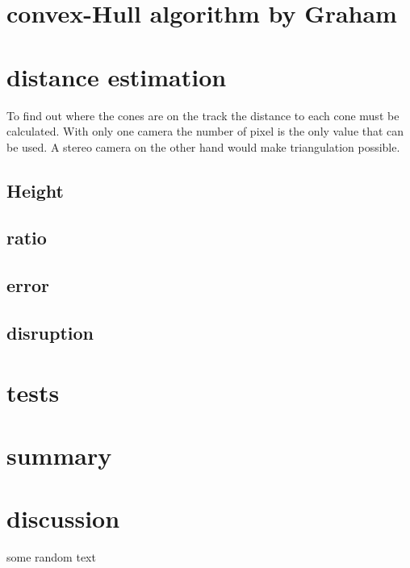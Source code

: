 \documentclass[10pt,a4paper]{article}
\begin{document}
	\section{convex-Hull algorithm by Graham} \label{convex-hull}
	
	\section{distance estimation}
	To find out where the cones are on the track the distance to each cone must be calculated. 
	With only one camera the number of pixel is the only value that can be used. 
	A stereo camera on the other hand would make triangulation possible.

	\subsection{Height}
	
	\subsection{ratio}
	
	\subsection{error}
	
	\subsection{disruption}
	
	\section{tests}
	
	\section{summary}
	
	\section{discussion}
	some random text
	\printbibliography[title={Book references},type=book]
\end{document}
